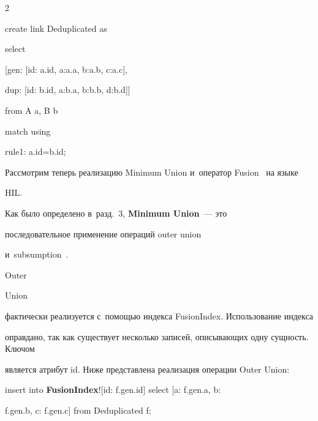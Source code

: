 \begin{multicols}{2}
{\sf

\noindent

  create link Deduplicated as



\noindent

  select





\noindent

[gen: [id: a.id, a:a.a, b:a.b, c:a.c],



\noindent

  dup:  [id: b.id, a:b.a, b:b.b, d:b.d]]



\noindent

  from A a, B b



\noindent

  match using



\noindent

  \hspace*{3pt}rule1: a.id\;=\;b.id;

  }



  Рассмотрим теперь реализацию Minimum Union и~оператор Fusion~\cite{13-vov} на языке

HIL.



  Как было определено в~разд.~3, \textbf{Minimum Union}~--- это

последовательное применение операций {\sf outer union}

и~{\sf subsumption}~\cite{11-vov}. {\sf Outer

Union} фактически реализуется с~помощью индекса {\sf FusionIndex}. Использование индекса

оправдано, так как существует несколько записей, описывающих одну сущность. Ключом

является атрибут id. Ниже представлена реализация операции {\sf Outer Union}:



{\sf

\noindent

  insert into {\textbf{FusionIndex}}![id: f.gen.id] select [a: f.gen.a, b:

f.gen.b, c: f.gen.c] from Deduplicated f;



  \vspace*{6pt}



}
\end{multicols}
